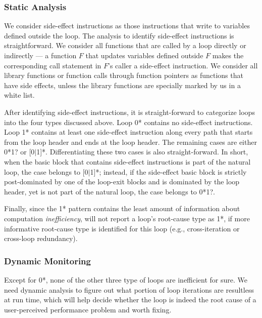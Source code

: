 \subsubsection{Static Analysis}
\label{sec:6_s_workless}

We consider side-effect instructions as those instructions that write to
variables defined outside the loop. The analysis to identify side-effect
instructions is straightforward. We consider all functions that are called
by a loop directly or indirectly --- a function $F$ that updates variables
defined outside $F$ makes the corresponding call statement in $F$'s
caller a side-effect instruction.
We consider all library functions or function calls through function pointers 
as functions that have side effects, 
unless the library functions are specially marked by us in a white list.

After identifying side-effect instructions, it is straight-forward to
categorize loops into the four types discussed above.
Loop 0* contains no side-effect instructions. 
Loop 1* contains at least one side-effect instruction along every path that
starts from the loop header and ends at the loop header.
The remaining cases are either 
0*1? or [0$|$1]*. 
Differentiating these two cases is also straight-forward.
In short, when the basic block that contains side-effect instructions
is part of the natural loop, the case
belongs to [0$|$1]*; instead, if the side-effect basic block is strictly post-dominated
by one of the loop-exit blocks and is dominated by the loop header, yet is
not part of the natural loop, the case belongs to 0*1?.

Finally, since the 1* pattern contains the least amount of information
about computation \textit{inefficiency}, \Tool will not report a loop's
root-cause type as 1*, if more informative root-cause type is identified 
for this loop (e.g., cross-iteration or cross-loop redundancy).

\subsubsection{Dynamic Monitoring}
\label{sec:6_d_workless}

Except for 0*, none of the other three type of loops are inefficient for sure.
We need dynamic analysis to figure out what portion of loop iterations are
resultless at run time, which will help decide whether the loop is indeed
the root cause of a user-perceived performance problem and worth fixing.

